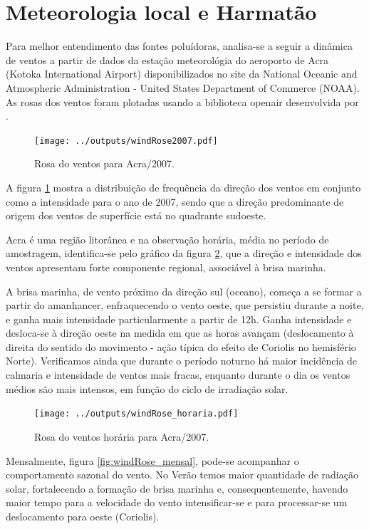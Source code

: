 \section{Meteorologia local e Harmatão}

Para melhor entendimento das fontes poluídoras, analisa-se a seguir a 
dinâmica de ventos a partir de dados da estação meteorológia do 
aeroporto de Acra (Kotoka International Airport) disponibilizados no site da 
National Oceanic and Atmospheric Administration - United States Department of 
Commerce (NOAA). As rosas dos ventos foram plotadas usando a biblioteca 
openair desenvolvida por \citet{carslaw2012}.

\begin{figure}[H]
  \centering
  \texttt{[image: ../outputs/windRose2007.pdf]}
  \caption{Rosa do ventos para Acra/2007. \label{fg:rosaCompleta}}
\end{figure}

A figura \ref{fg:rosaCompleta} mostra a distribuição de frequência da direção 
dos ventos em conjunto como a intensidade para o ano de 2007, sendo que a direção 
predominante de origem dos ventos de superfície está no quadrante sudoeste.

Acra é uma região litorânea e na observação horária, média no período de 
amostragem, identifica-se pelo gráfico da figura \ref{fig:windRose_horaria}, 
que a direção e intensidade dos ventos apresentam forte componente regional, 
associável à brisa marinha.

A brisa marinha, de vento próximo da direção sul (oceano), começa a se formar a 
partir do amanhancer, enfraquecendo o vento oeste, que persistiu durante a noite,
e ganha mais intensidade particularmente a partir de 12h. Ganha intensidade e 
desloca-se à direção oeste na medida em que as horas avançam 
(deslocamento à direita do sentido do movimento - ação típica do efeito de 
Coriolis no hemisfério Norte). 
Verificamos ainda que durante o período noturno há maior incidência de calmaria
e intensidade de ventos mais fracas, enquanto durante o dia os ventos médios são
mais intensos, em função do ciclo de irradiação solar.

\begin{figure}[H]
  \centering
  \texttt{[image: ../outputs/windRose\_horaria.pdf]}
  \caption{Rosa do ventos horária para Acra/2007. \label{fig:windRose_horaria}}
\end{figure}

Mensalmente, figura \ref{fig:windRose_mensal}, pode-se acompanhar o 
comportamento sazonal do vento. No Verão temos maior quantidade de radiação 
solar, fortalecendo a formação de brisa marinha e, consequentemente, havendo 
maior tempo para a velocidade do vento intensificar-se e para processar-se um 
deslocamento para oeste (Coriolis). 

